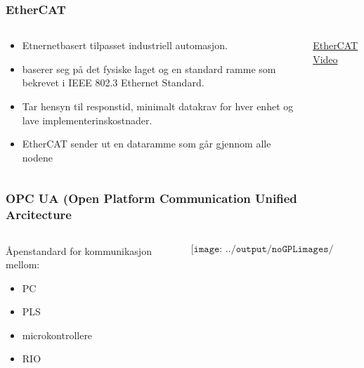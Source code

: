 \documentclass[aspectratio=169,xcolor=dvipsnames]{beamer}
\begin{document}
\begin{frame}
	\frametitle{EtherCAT}
	\begin{columns}
		\begin{column}{0.5\textwidth}

			\begin{itemize}
				\item Etnernetbasert tilpasset industriell automasjon. 
				\item baserer seg på det fysiske laget og en standard ramme som bekrevet i IEEE 802.3 Ethernet Standard. 
				\item Tar hensyn til responstid, minimalt datakrav for hver enhet og lave implementerinskostnader. 
				\item EtherCAT sender ut en dataramme som går gjennom alle nodene
			\end{itemize}

			
		\end{column}

		\begin{column}{0.5\textwidth}
			\href{https://www.youtube.com/watch?v=z2OagcHG-UU}{EtherCAT Video}
		\end{column}
	\end{columns}
\end{frame}
\begin{frame}
	\frametitle{OPC UA (Open Platform Communication Unified Arcitecture}
	\begin{columns}
		\begin{column}{0.5\textwidth}

				Åpenstandard for kommunikasjon mellom:
			\begin{itemize}
				\item PC
				\item PLS
				\item microkontrollere
				\item RIO
			\end{itemize}

			
		\end{column}

		\begin{column}{0.5\textwidth}
	$$\texttt{[image: ../output/noGPLimages/kap5x86]}$$
		\end{column}
	\end{columns}
\end{frame}
\end{document}
